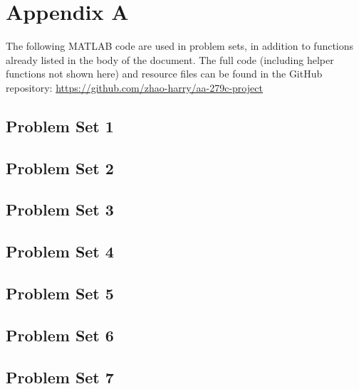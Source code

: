 \appendix

\section{Appendix A}
The following MATLAB code are used in problem sets, in addition to functions already listed in the body of the document. The full code (including helper functions not shown here) and resource files can be found in the GitHub repository: \url{https://github.com/zhao-harry/aa-279c-project}

\subsection{Problem Set 1}


\newpage
\subsection{Problem Set 2}








\newpage
\subsection{Problem Set 3}



\newpage
\subsection{Problem Set 4}


\newpage
\subsection{Problem Set 5}







\newpage
\subsection{Problem Set 6}


\newpage
\subsection{Problem Set 7}

